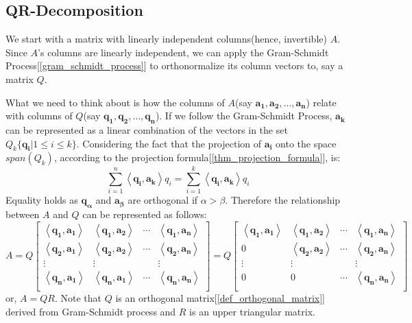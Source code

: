 \documentclass{report}
\begin{document}
		\subsection{QR-Decomposition}
			We start with a matrix with linearly independent columns(hence, invertible) $A$. Since $A$'s columns are linearly independent, we can apply the Gram-Schmidt Process[\ref{gram_schmidt_process}] to orthonormalize its column vectors to, say a matrix $Q$.
			
			What we need to think about is how the columns of $A$(say $\bm{a_1}, \bm{a_2}, \dots, \bm{a_n}$) relate with columns of $Q$(say $\bm{q_1}, \bm{q_2}, \dots, \bm{q_n}$). If we follow the Gram-Schmidt Process, $\bm{a_k}$ can be represented as a linear combination of the vectors in the set $Q_k\{\bm{q_i}|1 \le i \le k\}$. Considering the fact that the projection of $\bm{a_i}$ onto the space $span(Q_k)$, according to the projection formula[\ref{thm_projection_formula}], is:
			\begin{displaymath}
				\sum_{i=1}^{n}\left<\bm{q_i},\bm{a_k}\right>q_i=\sum_{i=1}^{k}\left<\bm{q_i},\bm{a_k}\right>q_i
			\end{displaymath}
			Equality holds as $\bm{q_\alpha}$ and $\bm{a_\beta}$ are orthogonal if $\alpha>\beta$. Therefore the relationship between $A$ and $Q$ can be represented as follows:
			\begin{displaymath}
				A
				=
				Q
				\begin{bmatrix}
					\left<\bm{q_1}, \bm{a_1}\right> & \left<\bm{q_1}, \bm{a_2}\right> & \cdots & \left<\bm{q_1}, \bm{a_n}\right> \\
					\left<\bm{q_2}, \bm{a_1}\right> & \left<\bm{q_2}, \bm{a_2}\right> & \cdots & \left<\bm{q_2}, \bm{a_n}\right> \\
					\vdots                          & \vdots                          &        & \vdots                          \\
					\left<\bm{q_n}, \bm{a_1}\right> & \left<\bm{q_n}, \bm{a_1}\right> & \cdots & \left<\bm{q_n}, \bm{a_n}\right> \\
				\end{bmatrix}
				=
				Q
				\begin{bmatrix}
				\left<\bm{q_1}, \bm{a_1}\right> & \left<\bm{q_1}, \bm{a_2}\right> & \cdots & \left<\bm{q_1}, \bm{a_n}\right> \\
				0                               & \left<\bm{q_2}, \bm{a_2}\right> & \cdots & \left<\bm{q_2}, \bm{a_n}\right> \\
				\vdots                          & \vdots                          &        & \vdots                          \\
				0                               & 0                               & \cdots & \left<\bm{q_n}, \bm{a_n}\right> \\
				\end{bmatrix}
			\end{displaymath}
			or, $A=QR$. Note that $Q$ is an orthogonal matrix[\ref{def_orthogonal_matrix}] derived from Gram-Schmidt process and $R$ is an upper triangular matrix.
		
\end{document}
